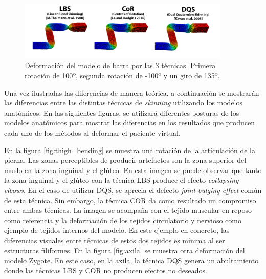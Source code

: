 \begin{figure}[h]%
  \centering
  \includegraphics[width=0.90\textwidth]{IMG/BarraCoR}
    \caption{Deformación del modelo de barra por las 3 técnicas. Primera rotación de 100º, segunda rotación de -100º y un giro de 135º.}
    \label{fig:bar_bending}
\end{figure}

Una vez ilustradas las diferencias de manera teórica, a continuación se mostrarán las diferencias entre las distintas técnicas de \emph{skinning} utilizando los modelos anatómicos. En las siguientes figuras, se utilizará diferentes posturas de los modelos anatómicos para mostrar las diferencias en los resultados que producen cada uno de los métodos al deformar el paciente virtual.

En la figura \ref{fig:thigh_bending} se muestra una rotación de la articulación de la pierna. Las zonas perceptibles de producir artefactos son la zona superior del muslo en la zona inguinal y el glúteo. En esta imagen se puede observar que tanto la zona inguinal y el glúteo con la técnica \ac{LBS} produce el efecto \emph{collapsing elbows}. En el caso de utilizar \ac{DQS}, se aprecia el defecto \emph{joint-bulging effect} común de esta técnica. Sin embargo, la técnica \ac{COR} da como resultado un compromiso entre ambas técnicas. La imagen se acompaña con el tejido muscular en reposo como referencia y la deformación de los tejidos circulatorio y nervioso como ejemplo de tejidos internos del modelo. En este ejemplo en concreto, las diferencias visuales entre técnicas de estos dos tejidos es mínima al ser estructuras filiformes. En la figura \ref{fig:axila} se muestra otra deformación del modelo Zygote. En este caso, en la axila, la técnica \ac{DQS} genera un abultamiento donde las técnicas \ac{LBS} y \ac{COR} no producen efectos no deseados.



